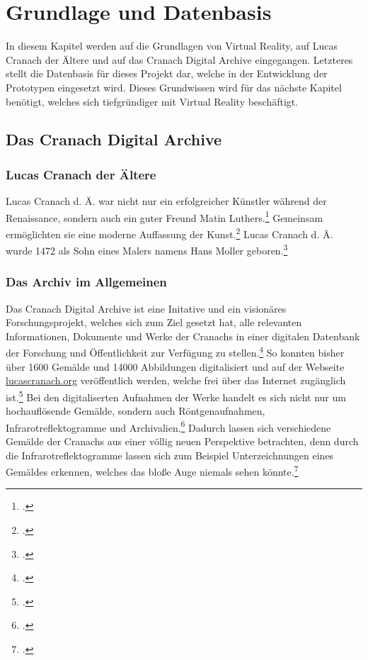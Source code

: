 \documentclass[a4paper,12pt,oneside]{article}
\begin{document}
  \section{Grundlage und Datenbasis}
    In diesem Kapitel werden auf die Grundlagen von Virtual Reality, auf Lucas Cranach 
    der Ältere und auf das Cranach Digital Archive eingegangen. Letzteres stellt 
    die Datenbasis für dieses Projekt dar, welche in der Entwicklung der Prototypen 
    eingesetzt wird. Dieses Grundwissen wird für das nächste Kapitel benötigt, welches 
    sich tiefgründiger mit Virtual Reality beschäftigt.

    \subsection{Das Cranach Digital Archive}
    \subsubsection{Lucas Cranach der Ältere}
    Lucas Cranach d. Ä. war nicht nur ein erfolgreicher Künstler während der Renaissance,
    sondern auch ein guter Freund Matin Luthers.\footcite[15-17]{heydenreich2017lucas}
    Gemeinsam ermöglichten sie eine moderne Auffassung der Kunst.\footcite[17]{heydenreich2017lucas}
    Lucas Cranach d. Ä. wurde 1472 als Sohn eines Malers namens Hans Moller geboren.\footcite[15]{heydenreich2017lucas}
    
    \subsubsection{Das Archiv im Allgemeinen}
    Das Cranach Digital Archive ist eine Initative und ein visionäres Forschungsprojekt, 
    welches sich zum Ziel gesetzt hat, alle relevanten Informationen, Dokumente und 
    Werke der Cranachs in einer digitalen Datenbank der Forschung und Öffentlichkeit zur 
    Verfügung zu stellen.\footcite[11]{heydenreich2017lucas}
    So konnten bisher über 1600 Gemälde und 14000 Abbildungen digitalisiert und auf der 
    Webseite \url{lucascranach.org} veröffentlich werden, welche frei über das
    Internet zugänglich ist.\footcite[11]{heydenreich2017lucas}
    Bei den digitaliserten Aufnahmen der Werke handelt es sich nicht nur um hochauflösende
    Gemälde, sondern auch Röntgenaufnahmen, Infrarotreflektogramme und
    Archivalien.\footcite[94-95]{heydenreich2017lucas} Dadurch lassen sich verschiedene
    Gemälde der Cranachs aus einer völlig neuen Perspektive betrachten, denn durch die
    Infrarotreflektogramme lassen sich zum Beispiel Unterzeichnungen
    eines Gemäldes erkennen, welches das bloße Auge niemals sehen könnte.\footcite[16]{heydenreich2017lucas}
    
\end{document}
